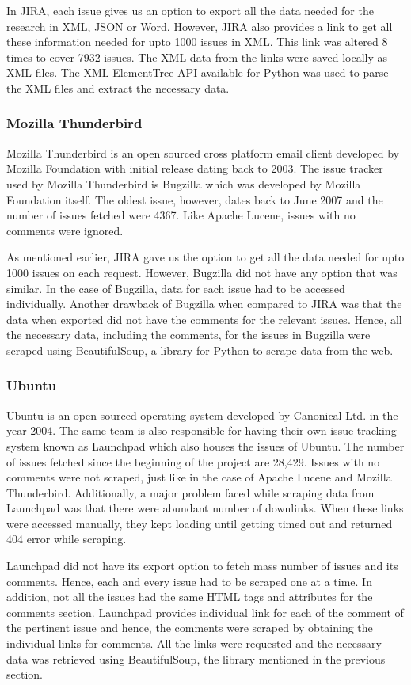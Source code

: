 \documentclass[a4paper,12pt,twoside]{report}
\begin{document}
In JIRA, each issue gives us an option to export all the data needed for the research in XML, JSON or Word. However, JIRA also provides a link to get all these information needed for upto 1000 issues in XML. This link was altered 8 times to cover 7932 issues. The XML data from the links were saved locally as XML files. The XML ElementTree API available for Python was used to parse the XML files and extract the necessary data. 

\subsubsection{Mozilla Thunderbird}
Mozilla Thunderbird is an open sourced cross platform email client developed by Mozilla Foundation with initial release dating back to 2003. The issue tracker used by Mozilla Thunderbird is Bugzilla which was developed by Mozilla Foundation itself. The oldest issue, however, dates back to June 2007 and the number of issues fetched were 4367. Like Apache Lucene, issues with no comments were ignored. 

As mentioned earlier, JIRA gave us the option to get all the data needed for upto 1000 issues on each request. However, Bugzilla did not have any option that was similar. In the case of Bugzilla, data for each issue had to be accessed individually. Another drawback of Bugzilla when compared to JIRA was that the data when exported did not have the comments for the relevant issues. Hence, all the necessary data, including the comments, for the issues in Bugzilla were scraped using BeautifulSoup, a library for Python to scrape data from the web. 

\subsubsection{Ubuntu}
Ubuntu is an open sourced operating system developed by Canonical Ltd. in the year 2004. The same team is also responsible for having their own issue tracking system known as Launchpad which also houses the issues of Ubuntu. The number of issues fetched since the beginning of the project are 28,429. Issues with no comments were not scraped, just like in the case of Apache Lucene and Mozilla Thunderbird. Additionally, a major problem faced while scraping data from Launchpad was that there were abundant number of downlinks. When these links were accessed manually, they kept loading until getting timed out and returned 404 error while scraping.

Launchpad did not have its export option to fetch mass number of issues and its comments. Hence, each and every issue had to be scraped one at a time. In addition, not all the issues had the same HTML tags and attributes for the comments section. Launchpad provides individual link for each of the comment of the pertinent issue and hence, the comments were scraped by obtaining the individual links for comments. All the links were requested and the necessary data was retrieved using BeautifulSoup, the library mentioned in the previous section.
\end{document}
